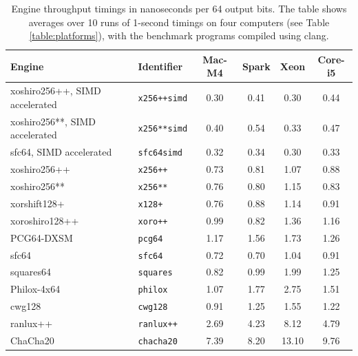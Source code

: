 \documentclass[manuscript,screen,review]{acmart}
\begin{document}
\begin{table}[t]
\centering
\caption{Engine throughput timings in nanoseconds per 64 output bits.
  The table shows averages over 10 runs of 1-second timings on four
  computers (see Table \ref{table:platforms}), with the benchmark
  programs compiled using clang.}
\label{tab:bench-engines}
\setlength{\tabcolsep}{4pt}
\begin{tabular}{
  ll
  S[table-format=1.2]
  S[table-format=1.2]
  S[table-format=2.2]
  S[table-format=1.2]
}
\toprule
Engine & Identifier & {Mac-M4}
& {Spark} & {Xeon}
& {Core-i5} \\
\midrule
xoshiro256++, SIMD accelerated & \texttt{x256++simd} & 0.30 & 0.41 & 0.30 & 0.44 \\
xoshiro256**, SIMD accelerated & \texttt{x256**simd} & 0.40 & 0.54 & 0.33 & 0.47 \\
sfc64, SIMD accelerated        & \texttt{sfc64simd}  & 0.32 & 0.34 & 0.30 & 0.33 \\
xoshiro256++                   & \texttt{x256++}     & 0.73 & 0.81 & 1.07 & 0.88 \\
xoshiro256**                   & \texttt{x256**}     & 0.76 & 0.80 & 1.15 & 0.83 \\
xorshift128+                   & \texttt{x128+}      & 0.76 & 0.88 & 1.14 & 0.91 \\
xoroshiro128++                 & \texttt{xoro++}     & 0.99 & 0.82 & 1.36 & 1.16 \\
PCG64-DXSM                     & \texttt{pcg64}      & 1.17 & 1.56 & 1.73 & 1.26 \\
sfc64                          & \texttt{sfc64}      & 0.72 & 0.70 & 1.04 & 0.91 \\
squares64                      & \texttt{squares}    & 0.82 & 0.99 & 1.99 & 1.25 \\
Philox-4x64                    & \texttt{philox}     & 1.07 & 1.77 & 2.75 & 1.51 \\
cwg128                         & \texttt{cwg128}     & 0.91 & 1.25 & 1.55 & 1.22 \\
ranlux++                       & \texttt{ranlux++}   & 2.69 & 4.23 & 8.12 & 4.79 \\
ChaCha20                       & \texttt{chacha20}   & 7.39 & 8.20 & 13.10 & 9.76 \\
\bottomrule
\end{tabular}
\end{table}
\end{document}
